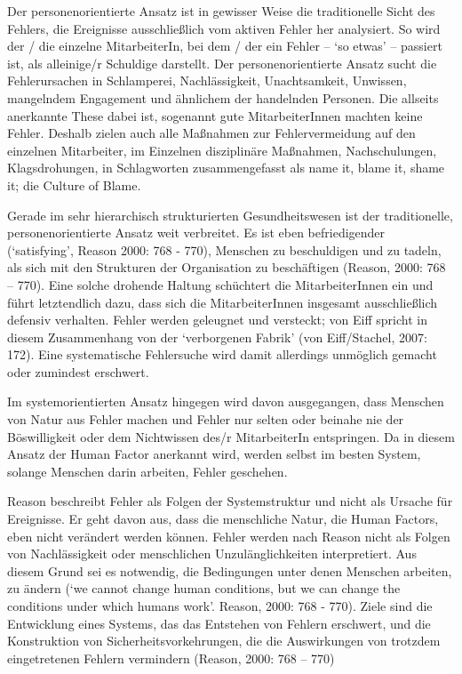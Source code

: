 Der
personenorientierte Ansatz ist in gewisser Weise die
traditionelle Sicht des Fehlers, die Ereignisse
ausschließlich vom aktiven Fehler her analysiert. So wird
der / die einzelne MitarbeiterIn, bei dem / der ein Fehler
– \enquote*{so etwas} – passiert ist, als alleinige/r Schuldige
darstellt. Der personenorientierte Ansatz sucht die
Fehlerursachen in Schlamperei, Nachlässigkeit,
Unachtsamkeit, Unwissen, mangelndem Engagement und
ähnlichem der handelnden Personen. Die allseits anerkannte
These dabei ist, sogenannt gute MitarbeiterInnen machten
keine Fehler. Deshalb zielen auch alle Maßnahmen zur
Fehlervermeidung auf den einzelnen Mitarbeiter, im
Einzelnen disziplinäre Maßnahmen, Nachschulungen,
Klagsdrohungen, in Schlagworten zusammengefasst als name
it, blame it, shame it; die Culture of Blame.

Gerade im sehr hierarchisch
strukturierten Gesundheitswesen ist der traditionelle,
personenorientierte Ansatz weit verbreitet. Es ist eben
befriedigender (\enquote*{satisfying}, Reason 2000: 768 - 770),
Menschen zu beschuldigen und zu tadeln, als sich mit den
Strukturen der Organisation zu beschäftigen (Reason, 2000:
768 – 770). Eine solche drohende Haltung schüchtert die
MitarbeiterInnen ein und führt letztendlich dazu, dass sich
die MitarbeiterInnen insgesamt ausschließlich defensiv
verhalten. Fehler werden geleugnet und versteckt; von Eiff
spricht in diesem Zusammenhang von der \enquote*{verborgenen Fabrik}
(von Eiff/Stachel, 2007: 172). Eine systematische
Fehlersuche wird damit allerdings unmöglich gemacht oder
zumindest erschwert.

Im systemorientierten Ansatz hingegen
wird davon ausgegangen, dass Menschen von Natur aus Fehler
machen und Fehler nur selten oder beinahe nie der
Böswilligkeit oder dem Nichtwissen des/r MitarbeiterIn
entspringen. Da in diesem Ansatz der Human Factor anerkannt
wird, werden selbst im besten System, solange Menschen
darin arbeiten, Fehler geschehen.

Reason beschreibt Fehler als Folgen der
Systemstruktur und nicht als Ursache für Ereignisse. Er
geht davon aus, dass die menschliche Natur, die Human
Factors, eben nicht verändert werden können. Fehler werden
nach Reason nicht als Folgen von Nachlässigkeit oder
menschlichen Unzulänglichkeiten interpretiert. Aus diesem
Grund sei es notwendig, die Bedingungen unter denen
Menschen arbeiten, zu ändern (\enquote*{we cannot change human
conditions, but we can change the conditions under which
humans work}. Reason, 2000: 768 - 770). Ziele sind die
Entwicklung eines Systems, das das Entstehen von Fehlern
erschwert, und die Konstruktion von
Sicherheitsvorkehrungen, die die Auswirkungen von trotzdem
eingetretenen Fehlern vermindern (Reason, 2000: 768 – 770)



